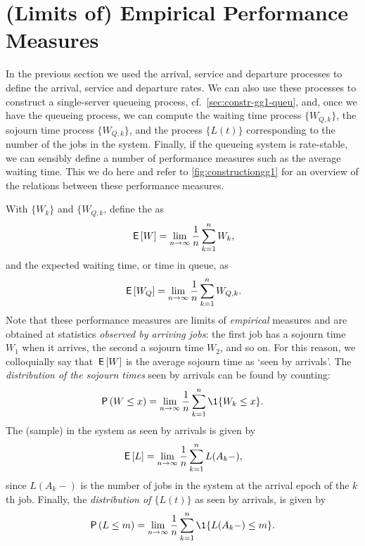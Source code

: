 \section{(Limits of) Empirical Performance Measures}
\label{sec:limits-of-emperical}

In the previous section we used the arrival, service and departure processes to define the arrival, service and departure rates.
We can also use these processes to construct a single-server queueing process, cf.~\cref{sec:constr-gg1-queu}, and, once we have the queueing process, we can compute the waiting time process $\{W_{Q,k}\}$, the sojourn time process $\{W_{Q,k}\}$, and the process $\{L(t)\}$ corresponding to the number of the jobs in the system.
Finally, if the queueing system is rate-stable, we can sensibly define a number of performance measures such as the average waiting time.
This we do here and refer to \cref{fig:constructiongg1} for an overview of the relations between these performance measures.




With $\{W_k\}$ and $\{W_{Q,k}$, define the  as
\begin{equation}\label{eq:49}
 \,\mathsf{E}\left[W\right] = \lim_{n\to\infty} \frac 1n\sum_{k=1}^n W_k,
\end{equation}
and the expected waiting time, or time in queue, as
\begin{equation}\label{eq:50}
 \,\mathsf{E}\left[W_Q\right] = \lim_{n\to\infty} \frac 1 n\sum_{k=1}^n W_{Q,k}.
\end{equation}
Note that these performance measures are limits of \emph{empirical} measures and are obtained at statistics \emph{observed by arriving jobs}: the first job has a sojourn time $W_1$ when it arrives, the second a sojourn time $W_2$, and so on.
For this reason, we colloquially say that $\,\mathsf{E}\left[W\right]$ is the average sojourn time as `seen by arrivals'.
The \emph{distribution of the sojourn times} seen by arrivals can be found by counting:
\begin{equation}\label{eq:48}
 \P{W \leq x} = \lim_{n\to\infty} \frac 1n\sum_{k=1}^n \1{W_k\leq x}.
\end{equation}
The (sample)  in the system as seen by arrivals is given by
\begin{equation}\label{eq:EQ}
\,\mathsf{E}\left[L\right] = \lim_{n\to\infty}\frac 1 n \sum_{k=1}^n L(A_k-),
\end{equation}
since $L(A_k-)$ is the number of jobs in the system at the arrival epoch of the $k$th job.
Finally, the \emph{distribution of $\{L(t)\}$} as seen by arrivals, is given by
\begin{equation}\label{eq:Qm}
\P{L\leq m} = \lim_{n\to\infty} \frac 1 n \sum_{k=1}^n \1{L(A_k-) \leq m}.
\end{equation}



